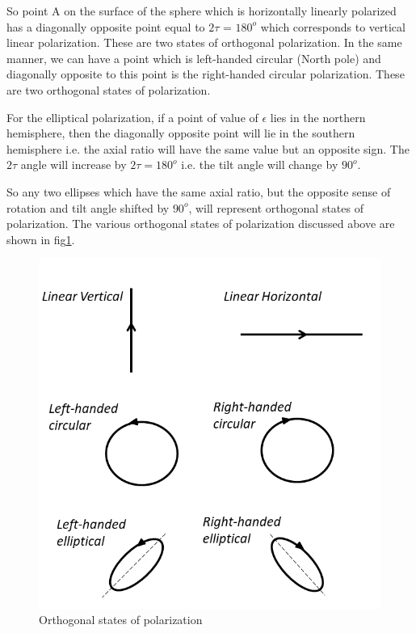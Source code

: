 So point A on the surface of the sphere which is horizontally linearly polarized has a diagonally opposite point equal to $2\tau$ = $180^{o}$ which corresponds to vertical linear polarization. These are two states of orthogonal polarization. In the same manner, we can have a point which is left-handed circular (North pole) and diagonally opposite to this point is the right-handed circular polarization. These are two orthogonal states of polarization.

For the elliptical polarization, if a point of value of $\epsilon$ lies in the northern hemisphere, then the diagonally opposite point will lie in the southern hemisphere i.e. the axial ratio will have the same value but an opposite sign. The $2\tau$ angle will increase by $2\tau = 180^{o}$ i.e. the tilt angle will change by $90^{o}$.

So any two ellipses which have the same axial ratio, but the opposite sense of rotation and tilt angle shifted by $90^{o}$, will represent orthogonal states of polarization. The various orthogonal states of polarization discussed above are shown in fig\ref{fig:orthogonal_states_of_polarization}.

\begin{figure}[h]
\centering
\includegraphics[width=0.9\linewidth]{graphics/orthogonal_states}
\caption{Orthogonal states of polarization}
\label{fig:orthogonal_states_of_polarization}
\end{figure}

